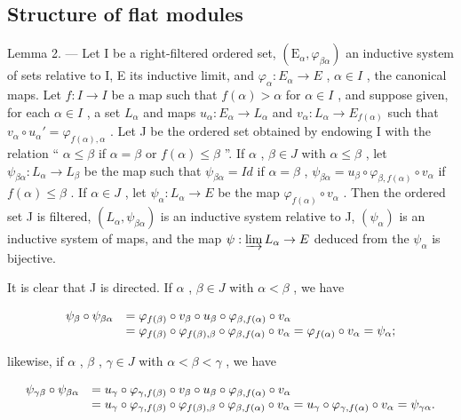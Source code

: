 \subsection{Structure of flat modules}

Lemma 2. --- Let I be a right-filtered ordered set, \((\mathrm{E}_{\alpha}, \varphi_{\beta\alpha})\) an inductive system of sets relative to I, E its inductive limit, and \(\varphi_{\alpha}: E_{\alpha} \to E\) , \(\alpha \in I\) , the canonical maps. Let \(f: I \to I\) be a map such that \(f(\alpha) > \alpha\) for \(\alpha \in I\) , and suppose given, for each \(\alpha \in I\) , a set \(L_{\alpha}\) and maps \(u_{\alpha}: E_{\alpha} \to L_{\alpha}\) and \(v_{\alpha}: L_{\alpha} \to E_{f(\alpha)}\) such that \(v_{\alpha} \circ u_{\alpha}' = \varphi_{f(\alpha),\alpha}\) . Let J be the ordered set obtained by endowing I with the relation “ \(\alpha \leqslant \beta\) if \(\alpha = \beta\) or \(f(\alpha) \leqslant \beta\) ”. If \(\alpha\) , \(\beta \in J\) with \(\alpha \leqslant \beta\) , let \(\psi_{\beta\alpha}: L_{\alpha} \to L_{\beta}\) be the map such that \(\psi_{\beta\alpha} = Id\) if \(\alpha = \beta\) , \(\psi_{\beta\alpha} = u_{\beta} \circ \varphi_{\beta,f(\alpha)} \circ v_{\alpha}\) if \(f(\alpha) \leqslant \beta\) . If \(\alpha \in J\) , let \(\psi_{\alpha}: L_{\alpha} \to E\) be the map \(\varphi_{f(\alpha)} \circ v_{\alpha}\) . Then the ordered set J is filtered, \((L_{\alpha}, \psi_{\beta\alpha})\) is an inductive system relative to J, \((\psi_{\alpha})\) is an inductive system of maps, and the map \(\psi: \varinjlim L_{\alpha} \to E\) deduced from the \(\psi_{\alpha}\) is bijective.

It is clear that J is directed. If \(\alpha\) , \(\beta \in J\) with \(\alpha < \beta\) , we have

\[
\begin{array}{r l} \psi_ {\beta} \circ \psi_ {\beta \alpha} & = \varphi_ {f (\beta)} \circ v _ {\beta} \circ u _ {\beta} \circ \varphi_ {\beta , f (\alpha)} \circ v _ {\alpha} \\ & = \varphi_ {f (\beta)} \circ \varphi_ {f (\beta), \beta} \circ \varphi_ {\beta , f (\alpha)} \circ v _ {\alpha} = \varphi_ {f (\alpha)} \circ v _ {\alpha} = \psi_ {\alpha}; \end{array}
\]

likewise, if \(\alpha\) , \(\beta\) , \(\gamma \in J\) with \(\alpha < \beta < \gamma\) , we have

\[
\begin{array}{r l} \psi_ {\gamma \beta} \circ \psi_ {\beta \alpha} & = u _ {\gamma} \circ \varphi_ {\gamma , f (\beta)} \circ v _ {\beta} \circ u _ {\beta} \circ \varphi_ {\beta , f (\alpha)} \circ v _ {\alpha} \\ & = u _ {\gamma} \circ \varphi_ {\gamma , f (\beta)} \circ \varphi_ {f (\beta), \beta} \circ \varphi_ {\beta , f (\alpha)} \circ v _ {\alpha} = u _ {\gamma} \circ \varphi_ {\gamma , f (\alpha)} \circ v _ {\alpha} = \psi_ {\gamma \alpha}. \end{array}
\]


